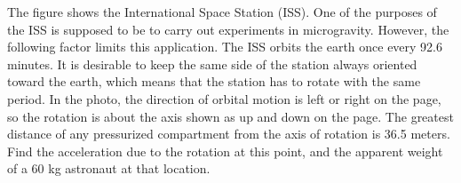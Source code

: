 The figure shows the International Space Station (ISS). One of the purposes of the ISS is
supposed to be to carry out experiments in microgravity. However, the following factor
limits this application. The ISS orbits the earth once every
92.6 minutes. It is desirable to keep the same side of the station always oriented toward the
earth, which means that the station has to rotate with the same period. In the photo, the
direction of orbital motion is left or right on the page, so the rotation is about the
axis shown as up and down on the page. The greatest distance of any pressurized compartment
from the axis of rotation is 36.5 meters. Find the acceleration due to the rotation at this point,
and the apparent weight of
a 60 kg astronaut at that location.\answercheck
